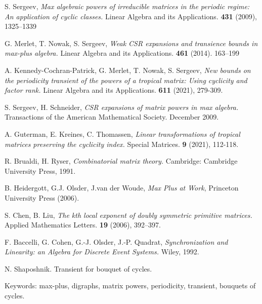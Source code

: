 \documentclass[12pt]{article}
\theoremstyle{definition}
\begin{document}
\begin{thebibliography}{9}

S. Sergeev, \textit{Max algebraic powers of irreducible matrices in the periodic regime: An application of cyclic classes.} Linear Algebra and its Applications. \textbf{431} (2009), 1325–1339

G. Merlet, T. Nowak, S. Sergeev, \textit{Weak CSR expansions and transience bounds in max-plus algebra.}
Linear Algebra and its Applications. \textbf{461} (2014). 163–199

A. Kennedy-Cochran-Patrick, G. Merlet, T. Nowak, S. Sergeev,
\textit{New bounds on the periodicity transient of the powers of a tropical matrix: Using cyclicity and factor rank.}
Linear Algebra and its Applications. \textbf{611} (2021), 279-309.

S. Sergeev, H. Schneider,
\textit{CSR expansions of matrix powers in max algebra.} Transactions of the American Mathematical Society. December 2009.

A. Guterman, E. Kreines, C. Thomassen,
\textit{Linear transformations of tropical matrices
preserving the cyclicity index.}
Special Matrices. \textbf{9} (2021), 112-118.

R. Brualdi, H. Ryser, \textit{Combinatorial matrix theory.} Cambridge: Cambridge University Press, 1991.

B. Heidergott, G.J. Olsder, J.van der Woude, \textit{Max Plus at Work}, Princeton University Press (2006).

S. Chen, B. Liu, \textit{The kth local exponent of doubly symmetric primitive matrices.} Applied Mathematics Letters. \textbf{19} (2006), 392–397.

F. Baccelli, G. Cohen, G.-J. Olsder, J.-P. Quadrat, \textit{Synchronization and Linearity: an Algebra for Discrete Event Systems.} Wiley, 1992.

\end{thebibliography}

N. Shaposhnik. Transient for bouquet of cycles.

Keywords: max-plus, digraphs, matrix powers, periodicity, transient, bouquets of cycles.
\end{document}
